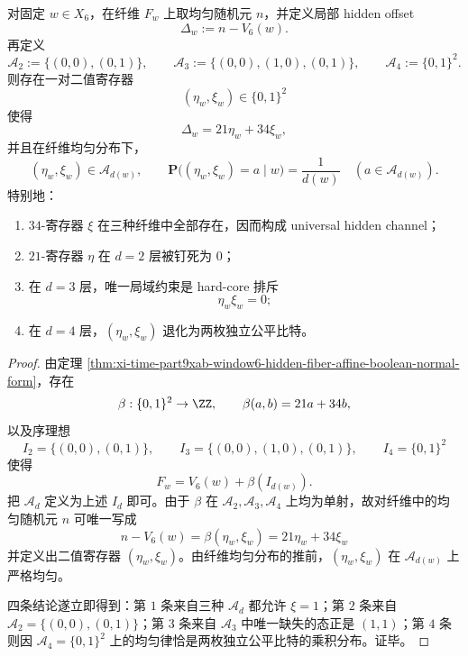 \begin{theorem}\label{thm:xi-time-part9xaba-window6-hidden-two-register-normal-form}
对固定 \(w\in X_6\)，在纤维 \(F_w\) 上取均匀随机元 \(n\)，并定义局部 hidden offset
\[
\Delta_w:=n-V_6(w).
\]
再定义
\[
\mathcal A_2:=\{(0,0),(0,1)\},\qquad
\mathcal A_3:=\{(0,0),(1,0),(0,1)\},\qquad
\mathcal A_4:=\{0,1\}^2.
\]
则存在一对二值寄存器
\[
(\eta_w,\xi_w)\in\{0,1\}^2
\]
使得
\[
\Delta_w=21\eta_w+34\xi_w,
\]
并且在纤维均匀分布下，
\[
(\eta_w,\xi_w)\in \mathcal A_{d(w)},
\qquad
\mathbf P\bigl((\eta_w,\xi_w)=a\mid w\bigr)=\frac{1}{d(w)}
\quad (a\in \mathcal A_{d(w)}).
\]
特别地：
\begin{enumerate}
  \item \(34\)-寄存器 \(\xi\) 在三种纤维中全部存在，因而构成 universal hidden channel；
  \item \(21\)-寄存器 \(\eta\) 在 \(d=2\) 层被钉死为 \(0\)；
  \item 在 \(d=3\) 层，唯一局域约束是 hard-core 排斥
  \[
  \eta_w\xi_w=0;
  \]
  \item 在 \(d=4\) 层，\((\eta_w,\xi_w)\) 退化为两枚独立公平比特。
\end{enumerate}
\end{theorem}
\begin{proof}
由定理 \ref{thm:xi-time-part9xab-window6-hidden-fiber-affine-boolean-normal-form}，存在
\[
\beta:\{0,1\}^2\to\ZZ,
\qquad
\beta(a,b)=21a+34b,
\]
以及序理想
\[
I_2=\{(0,0),(0,1)\},\qquad
I_3=\{(0,0),(1,0),(0,1)\},\qquad
I_4=\{0,1\}^2
\]
使得
\[
F_w=V_6(w)+\beta(I_{d(w)}).
\]
把 \(\mathcal A_d\) 定义为上述 \(I_d\) 即可。由于 \(\beta\) 在 \(\mathcal A_2,\mathcal A_3,\mathcal A_4\) 上均为单射，故对纤维中的均匀随机元 \(n\) 可唯一写成
\[
n-V_6(w)=\beta(\eta_w,\xi_w)=21\eta_w+34\xi_w
\]
并定义出二值寄存器 \((\eta_w,\xi_w)\)。由纤维均匀分布的推前，\((\eta_w,\xi_w)\) 在 \(\mathcal A_{d(w)}\) 上严格均匀。

四条结论遂立即得到：第 \(1\) 条来自三种 \(\mathcal A_d\) 都允许 \(\xi=1\)；第 \(2\) 条来自 \(\mathcal A_2=\{(0,0),(0,1)\}\)；第 \(3\) 条来自 \(\mathcal A_3\) 中唯一缺失的态正是 \((1,1)\)；第 \(4\) 条则因 \(\mathcal A_4=\{0,1\}^2\) 上的均匀律恰是两枚独立公平比特的乘积分布。证毕。
\end{proof}

